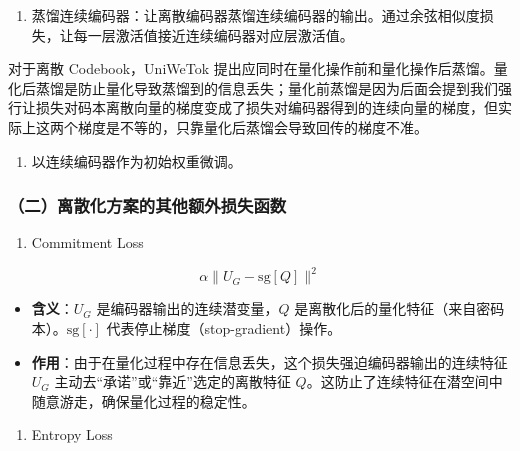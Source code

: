 \begin{enumerate}
\def\labelenumi{\arabic{enumi}.}
\tightlist
\item
  蒸馏连续编码器：让离散编码器蒸馏连续编码器的输出。通过余弦相似度损失，让每一层激活值接近连续编码器对应层激活值。
\end{enumerate}

对于离散 Codebook，UniWeTok 提出应同时在量化操作前和量化操作后蒸馏。量化后蒸馏是防止量化导致蒸馏到的信息丢失；量化前蒸馏是因为后面会提到我们强行让损失对码本离散向量的梯度变成了损失对编码器得到的连续向量的梯度，但实际上这两个梯度是不等的，只靠量化后蒸馏会导致回传的梯度不准。

\begin{enumerate}
\def\labelenumi{\arabic{enumi}.}
\setcounter{enumi}{1}
\tightlist
\item
  以连续编码器作为初始权重微调。
\end{enumerate}

\hypertarget{ux4e8cux79bbux6563ux5316ux65b9ux6848ux7684ux5176ux4ed6ux989dux5916ux635fux5931ux51fdux6570}{%
\subsubsection{（二）离散化方案的其他额外损失函数}\label{ux4e8cux79bbux6563ux5316ux65b9ux6848ux7684ux5176ux4ed6ux989dux5916ux635fux5931ux51fdux6570}}

\begin{enumerate}
\def\labelenumi{\arabic{enumi}.}
\tightlist
\item
  Commitment Loss
\end{enumerate}

\[
\alpha\lVert U_G-\mathrm{sg}[Q]\rVert^2
\]

\begin{itemize}
\tightlist
\item
  \textbf{含义}：\(U_G\) 是编码器输出的连续潜变量，\(Q\) 是离散化后的量化特征（来自密码本）。\(\mathrm{sg}[\cdot]\) 代表停止梯度（stop-gradient）操作。
\item
  \textbf{作用}：由于在量化过程中存在信息丢失，这个损失强迫编码器输出的连续特征 \(U_G\) 主动去``承诺''或``靠近''选定的离散特征 \(Q\)。这防止了连续特征在潜空间中随意游走，确保量化过程的稳定性。
\end{itemize}

\begin{enumerate}
\def\labelenumi{\arabic{enumi}.}
\setcounter{enumi}{1}
\tightlist
\item
  Entropy Loss
\end{enumerate}

